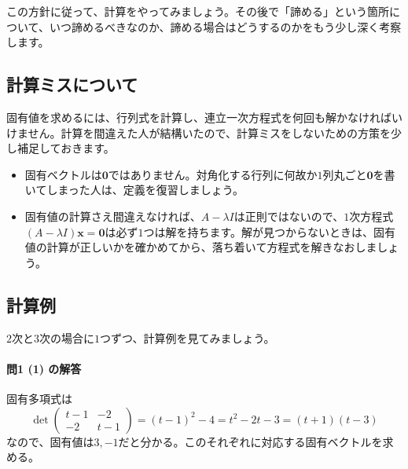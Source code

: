 この方針に従って、計算をやってみましょう。その後で「諦める」という箇所について、いつ諦めるべきなのか、諦める場合はどうするのかをもう少し深く考察します。

\subsection{計算ミスについて}

固有値を求めるには、行列式を計算し、連立一次方程式を何回も解かなければいけません。計算を間違えた人が結構いたので、計算ミスをしないための方策を少し補足しておきます。
\begin{itemize}
\item 固有ベクトルは$\bm{0}$ではありません。対角化する行列に何故か$1$列丸ごと$\bm{0}$を書いてしまった人は、定義を復習しましょう。
\item 固有値の計算さえ間違えなければ、$A - \lambda I$は正則ではないので、$1$次方程式$(A - \lambda I)\bm{x} = \bm{0}$は必ず$1$つは解を持ちます。解が見つからないときは、固有値の計算が正しいかを確かめてから、落ち着いて方程式を解きなおしましょう。
\end{itemize}

\subsection{計算例}

$2$次と$3$次の場合に$1$つずつ、計算例を見てみましょう。

\paragraph{問1 (1) の解答} 固有多項式は
\[
\det
\begin{pmatrix}
t - 1 & -2 \\
-2 & t - 1
\end{pmatrix}
= (t - 1)^2 - 4 = t^2 - 2t -3 = (t + 1)(t - 3)
\]
なので、固有値は$3, -1$だと分かる。このそれぞれに対応する固有ベクトルを求める。

